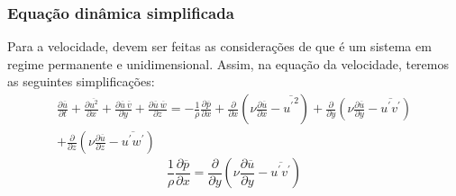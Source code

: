 \documentclass[xcolor=dvipsnames,10pt,aspectratio=169]{beamer}
\begin{document}
		\begin{frame}
			\frametitle{Equação dinâmica simplificada}
			Para a velocidade, devem ser feitas as considerações de que é um sistema em regime permanente e unidimensional.
			Assim, na equação da velocidade, teremos as seguintes simplificações:
			\begin{equation}
			\begin{split}
			\frac{\partial \overline{u}}{\partial t} + \frac{\partial \overline{u^2}}{\partial x} + \frac{\partial \overline{u} \ \overline{v}}{\partial y} +  \frac{\partial \overline{u} \ \overline{w}}{\partial z}  =  - \frac{1}{\rho} \frac{\partial \overline{{p}}}{\partial x} + \frac{\partial}{\partial x} \left( \nu \frac{\partial \overline{u}}{\partial x} - \overline{{u^\prime}^2}\right) + \frac{\partial}{\partial y} \left( \nu \frac{\partial \overline{u}}{\partial y} - \overline{{u^\prime  v^\prime}}\right) \\
			+ \frac{\partial}{\partial z} \left( \nu  \frac{\partial \overline{u}}{\partial z} - \overline{ u ^\prime w ^\prime} \right)
			\end{split}
			\end{equation}
			\begin{equation}
			\frac{1}{\rho} \frac{\partial \overline{p}}{\partial x} = \frac{\partial}{\partial y} \left( \nu \frac{\partial \overline{u}}{\partial y} - \overline{u^\prime v^\prime}\right)  
			\end{equation}
		\end{frame}
		
		
		
		
		
\end{document}
